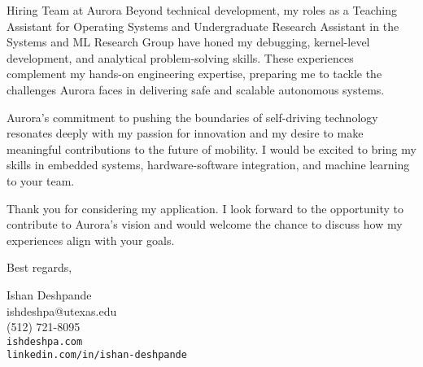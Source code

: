 \documentclass[a4paper,10pt]{letter}
\begin{document}
\begin{letter}{Hiring Team at Aurora}
Beyond technical development, my roles as a Teaching Assistant for Operating Systems and Undergraduate Research Assistant in the Systems and ML Research Group have honed my debugging, kernel-level development, and analytical problem-solving skills. These experiences complement my hands-on engineering expertise, preparing me to tackle the challenges Aurora faces in delivering safe and scalable autonomous systems.

Aurora's commitment to pushing the boundaries of self-driving technology resonates deeply with my passion for innovation and my desire to make meaningful contributions to the future of mobility. I would be excited to bring my skills in embedded systems, hardware-software integration, and machine learning to your team.

Thank you for considering my application. I look forward to the opportunity to contribute to Aurora's vision and would welcome the chance to discuss how my experiences align with your goals.

Best regards,

Ishan Deshpande \\
ishdeshpa@utexas.edu \\
(512) 721-8095 \\
\texttt{ishdeshpa.com} \\
\texttt{linkedin.com/in/ishan-deshpande}

\end{letter}
\end{document}
